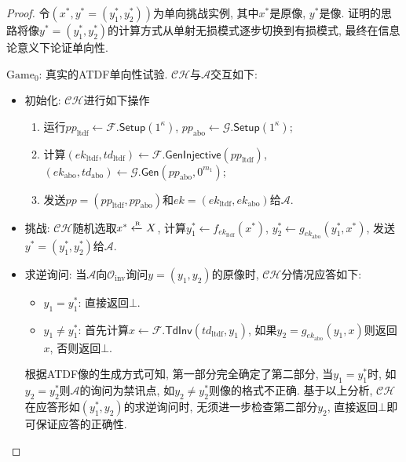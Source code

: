 \begin{proof}
令$(x^*, y^* = (y_1^*, y_2^*))$为单向挑战实例, 其中$x^*$是原像, $y^*$是像. 
证明的思路将像$y^* = (y_1^*, y_2^*)$的计算方式从单射无损模式逐步切换到有损模式, 最终在信息论意义下论证单向性.  
\begin{trivlist}
\item $\text{Game}_0$: 真实的ATDF单向性试验. $\mathcal{CH}$与$\mathcal{A}$交互如下:
\begin{itemize}
	\item 初始化: $\mathcal{CH}$进行如下操作
    	\begin{enumerate}
    		\item 运行$pp_\text{ltdf} \leftarrow \mathcal{F}.\mathsf{Setup}(1^\kappa)$, 
				$pp_\text{abo} \leftarrow \mathcal{G}.\mathsf{Setup}(1^\kappa)$; 
			\item 计算$(ek_\text{ltdf}, td_\text{ltdf}) \leftarrow \mathcal{F}.\mathsf{GenInjective}(pp_\text{ltdf})$, 
        		$(ek_\text{abo}, td_\text{abo}) \leftarrow \mathcal{G}.\mathsf{Gen}(pp_\text{abo}, 0^{m_1})$;
    		\item 发送$pp = (pp_\text{ltdf}, pp_\text{abo})$和$ek = (ek_\text{ltdf}, ek_\text{abo})$给$\mathcal{A}$. 
    	\end{enumerate}

	\item 挑战: $\mathcal{CH}$随机选取$x^* \xleftarrow{\textup{\tiny R}} X$, 
		计算$y_1^* \leftarrow f_{ek_\text{ltdf}}(x^*)$, $y_2^* \leftarrow g_{ek_\text{abo}}(y_1^*, x^*)$, 
		发送$y^* = (y_1^*, y_2^*)$给$\mathcal{A}$. 

	\item 求逆询问: 当$\mathcal{A}$向$\mathcal{O}_\text{inv}$询问$y = (y_1, y_2)$的原像时, $\mathcal{CH}$分情况应答如下:  
	\begin{itemize}
    	\item $y_1 = y_1^*$: 直接返回$\bot$.  
    	\item $y_1 \neq y_1^*$: 首先计算$x \leftarrow \mathcal{F}.\mathsf{TdInv}(td_\text{ltdf}, y_1)$, 
        	如果$y_2 =  g_{ek_\text{abo}}(y_1, x)$则返回$x$, 否则返回$\bot$. 
	\end{itemize}
	根据ATDF像的生成方式可知, 第一部分完全确定了第二部分, 当$y_1 = y_1^*$时, 
	如$y_2 = y_2^*$则$\mathcal{A}$的询问为禁讯点, 如$y_2 \neq y_2^*$则像的格式不正确. 
	基于以上分析, $\mathcal{CH}$在应答形如$(y_1^*, y_2)$的求逆询问时, 无须进一步检查第二部分$y_2$, 直接返回$\bot$即可保证应答的正确性. 
\end{itemize}


\end{trivlist}
\end{proof}
